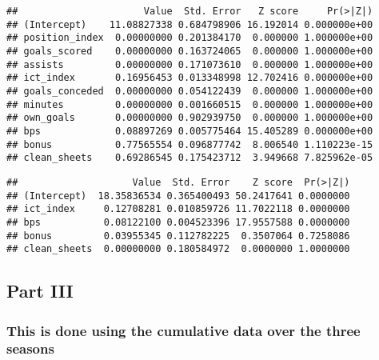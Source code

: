 \documentclass[]{article}
\newenvironment{Shaded}{\begin{snugshade}}{\end{snugshade}}
\newcommand{\DataTypeTok}[1]{\textcolor[rgb]{0.13,0.29,0.53}{#1}}
\newcommand{\KeywordTok}[1]{\textcolor[rgb]{0.13,0.29,0.53}{\textbf{#1}}}
\newcommand{\NormalTok}[1]{#1}
\newcommand{\OperatorTok}[1]{\textcolor[rgb]{0.81,0.36,0.00}{\textbf{#1}}}
\newcommand{\StringTok}[1]{\textcolor[rgb]{0.31,0.60,0.02}{#1}}
\begin{document}
\begin{verbatim}
##                      Value  Std. Error   Z score     Pr(>|Z|)
## (Intercept)    11.08827338 0.684798906 16.192014 0.000000e+00
## position_index  0.00000000 0.201384170  0.000000 1.000000e+00
## goals_scored    0.00000000 0.163724065  0.000000 1.000000e+00
## assists         0.00000000 0.171073610  0.000000 1.000000e+00
## ict_index       0.16956453 0.013348998 12.702416 0.000000e+00
## goals_conceded  0.00000000 0.054122439  0.000000 1.000000e+00
## minutes         0.00000000 0.001660515  0.000000 1.000000e+00
## own_goals       0.00000000 0.902939750  0.000000 1.000000e+00
## bps             0.08897269 0.005775464 15.405289 0.000000e+00
## bonus           0.77565554 0.096877742  8.006540 1.110223e-15
## clean_sheets    0.69286545 0.175423712  3.949668 7.825962e-05
\end{verbatim}

\begin{Shaded}
\end{Shaded}

\begin{verbatim}
##                    Value  Std. Error    Z score  Pr(>|Z|)
## (Intercept)  18.35836534 0.365400493 50.2417641 0.0000000
## ict_index     0.12708281 0.010859726 11.7022118 0.0000000
## bps           0.08122100 0.004523396 17.9557588 0.0000000
## bonus         0.03955345 0.112782225  0.3507064 0.7258086
## clean_sheets  0.00000000 0.180584972  0.0000000 1.0000000
\end{verbatim}

\hypertarget{part-iii}{%
\subsection{Part III}\label{part-iii}}

\hypertarget{this-is-done-using-the-cumulative-data-over-the-three-seasons}{%
\subsubsection{This is done using the cumulative data over the three
seasons}\label{this-is-done-using-the-cumulative-data-over-the-three-seasons}}
\end{document}
